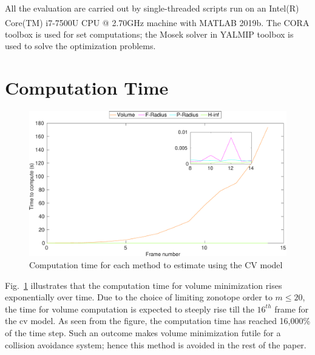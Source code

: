 All the evaluation are carried out by single-threaded scripts run on an Intel(R) Core(TM) i7-7500U CPU @ 2.70GHz machine with MATLAB\textsuperscript{\tiny\textregistered} 2019b. The CORA toolbox is used for set computations; the Mosek solver in YALMIP toolbox is used to solve the optimization problems.

\section{Computation Time}
\begin{figure}[H]
\centering
\includegraphics[width=\linewidth]{figures/timegraphh}
\caption{Computation time for each method to estimate using the CV model}
\label{fig:timegraph}
\end{figure}
Fig.~\ref{fig:timegraph} illustrates that the computation time for volume minimization rises exponentially over time. Due to the choice of limiting zonotope order to $m\leq20$, the time for volume computation is expected to steeply rise till the $16^{th}$ frame for the cv model. As seen from the figure, the computation time has reached 16,000\% of the time step. Such an outcome makes volume minimization futile for a collision avoidance system; hence this method is avoided in the rest of the paper.

